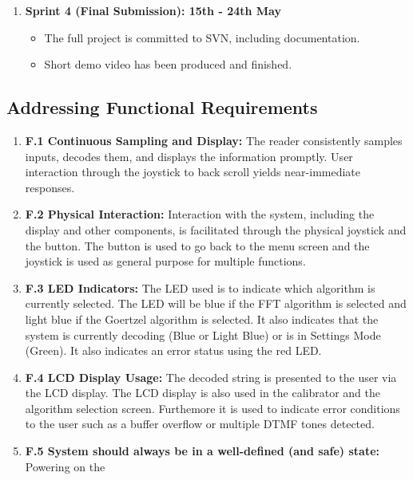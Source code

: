 \documentclass{cce2014-design}
\begin{document}
{{\begin{enumerate}
		  \item \textbf{Sprint 4 (Final Submission): 15th - 24th
			        May}
		        \begin{itemize}
			        \item The full project is committed to
			              SVN, including documentation.
			        \item Short demo video has been produced and
			              finished.
		        \end{itemize}
	  \end{enumerate}
  }\subsection{Addressing Functional Requirements}
  {
	  \begin{enumerate}
		  \item \textbf{F.1 Continuous Sampling and Display:} The
		        reader consistently samples inputs, decodes them, and
		        displays the information
		        promptly. User interaction through the joystick to back
		        scroll yields
		        near-immediate responses.
		  \item \textbf{F.2 Physical Interaction:} Interaction
		        with the system, including the display and other
		        components, is facilitated
		        through the physical joystick and the button. The
		        button is used to go back to
		        the menu screen and the  joystick is used as general
		        purpose for multiple
		        functions.
		  \item \textbf{F.3 LED Indicators:} The LED used is to
		        indicate which algorithm is currently selected. The LED
		        will be blue if the FFT
		        algorithm is selected and light blue if the Goertzel
		        algorithm is selected. It
		        also indicates that the system is currently decoding
		        (Blue or Light Blue) or is
		        in Settings Mode (Green). It also indicates an error
		        status using the red LED.
		  \item \textbf{F.4 LCD Display Usage:} The decoded
		        string is presented to the user via the LCD display.
		        The LCD display is also
		        used in the calibrator and the algorithm selection
		        screen. Furthemore it is
		        used to indicate error conditions to the user such as a
		        buffer overflow or
		        multiple DTMF tones detected.
		  \item \textbf{F.5 System should always be in a
			        well-defined (and safe) state:} Powering on the

\end{enumerate}}}
\end{document}

